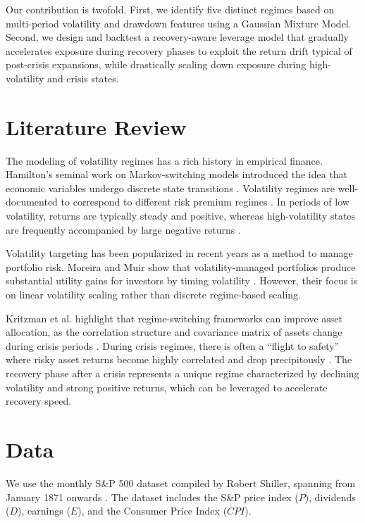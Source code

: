 \documentclass[11pt]{article}
\begin{document}
Our contribution is twofold. First, we identify five distinct regimes based on multi-period volatility and drawdown features using a Gaussian Mixture Model. Second, we design and backtest a recovery-aware leverage model that gradually accelerates exposure during recovery phases to exploit the return drift typical of post-crisis expansions, while drastically scaling down exposure during high-volatility and crisis states.

\section{Literature Review}
The modeling of volatility regimes has a rich history in empirical finance. Hamilton's seminal work on Markov-switching models introduced the idea that economic variables undergo discrete state transitions \citep{hamilton1989}. Volatility regimes are well-documented to correspond to different risk premium regimes \citep{ang2002}. In periods of low volatility, returns are typically steady and positive, whereas high-volatility states are frequently accompanied by large negative returns \citep{french1987}.

Volatility targeting has been popularized in recent years as a method to manage portfolio risk. Moreira and Muir show that volatility-managed portfolios produce substantial utility gains for investors by timing volatility \citep{moreira2017}. However, their focus is on linear volatility scaling rather than discrete regime-based scaling. 

Kritzman et al. highlight that regime-switching frameworks can improve asset allocation, as the correlation structure and covariance matrix of assets change during crisis periods \citep{kritzman2012}. During crisis regimes, there is often a ``flight to safety'' where risky asset returns become highly correlated and drop precipitously \citep{baele2019}. The recovery phase after a crisis represents a unique regime characterized by declining volatility and strong positive returns, which can be leveraged to accelerate recovery speed.

\section{Data}
We use the monthly S\&P 500 dataset compiled by Robert Shiller, spanning from January 1871 onwards \citep{shiller2015}. The dataset includes the S\&P price index ($P$), dividends ($D$), earnings ($E$), and the Consumer Price Index ($CPI$).
\end{document}
